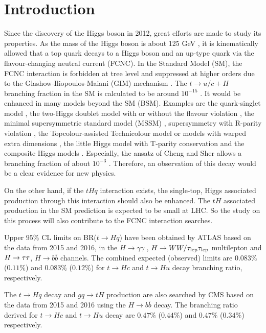 \section{Introduction}
\label{sec:intro}
Since the discovery of the Higgs boson in 2012, great efforts are made to study its properties. As the mass of the Higgs boson is about 125 GeV \cite{HiggsMass}, it is kinematically allowed that a top quark decays to a Higgs boson and an up-type quark via the flavour-changing neutral current (FCNC). In the Standard Model (SM), the FCNC interaction is forbidden at tree level and suppressed at higher orders due to the Glashow-Iliopoulos-Maiani (GIM) mechanism \cite{GIM}. The $t\to u/c+H$ branching fraction in the SM is calculated to be around $10^{-15}$ \cite{brtch3}. It would be enhanced in many models beyond the SM (BSM). Examples are the quark-singlet model \cite{quarkSinglet1,quarkSinglet2}, the two-Higgs doublet model with or without the flavour violation \cite{2hdm1,2hdm2}, the minimal supersymmetric standard model (MSSM) \cite{2hdm3}, supersymmetry with R-parity violation \cite{Rparity},
the Topcolour-assisted Technicolour model \cite{Techni} or models with warped extra dimensions \cite{extraD}, the little Higgs model with T-parity conservation \cite{littleH} and the composite Higgs models \cite{compositeH}.
Especially, the ansatz of Cheng and Sher \cite{Sher} allows a branching fraction of about $10^{-3}$ \cite{FCNC_rate}. Therefore, an observation of this decay would be a clear evidence for new physics.

On the other hand, if the $tHq$ interaction exists, the single-top, Higgs associated production through this interaction should also be enhanced. The $tH$ associated production in the SM prediction is expected to be small at LHC\cite{tHjb_production}. So the study on this process will also contribute to the FCNC interaction searches.

Upper $95\%$ CL limits on BR($t\to Hq$) have been obtained by ATLAS based on the data from 2015 and 2016, in the $H\to\gamma\gamma$ \cite{fcncgmgm}, $H\to WW/\tau_\text{lep}{}\tau_\text{lep}$ multilepton \cite{fcncml} and  $H \rightarrow \tau\tau$, $H\to b\bar{b}$ \cite{fcnctautau} channels. The combined expected (observed) limits are $0.083\%$ ($0.11\%$) and $0.083\%$ ($0.12\%$) for $t\to Hc$ and $t\to Hu$ decay branching ratio, respectively.

The $t\to Hq$ decay and $gq\to tH$ production are also searched by CMS based on the data from 2015 and 2016\cite{CMS-TOP-17-003} using the $H\to b\bar{b}$ decay. The branching ratio derived for $t\to Hc$ and $t\to Hu$ decay are $0.47\%$ ($0.44\%$) and $0.47\%$ ($0.34\%$) respectively.

